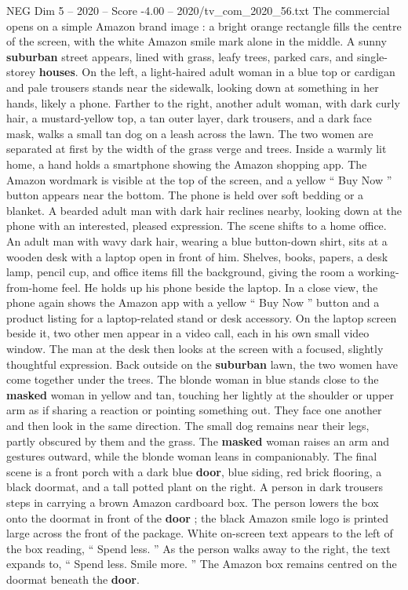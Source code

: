 \begin{textsample}{NEG Dim 5 – 2020 – Score -4.00 – 2020/tv\_com\_2020\_56.txt}  \label{ex:f5_neg_034}
The commercial opens on a simple Amazon brand image : a bright orange rectangle fills the centre of the screen, with the white Amazon smile mark alone in the middle.
A sunny \textbf{suburban} street appears, lined with grass, leafy trees, parked cars, and single-storey \textbf{houses}.
On the left, a light-haired adult woman in a blue top or cardigan and pale trousers stands near the sidewalk, looking down at something in her hands, likely a phone.
Farther to the right, another adult woman, with dark curly hair, a mustard-yellow top, a tan outer layer, dark trousers, and a dark face mask, walks a small tan dog on a leash across the lawn.
The two women are separated at first by the width of the grass verge and trees.
Inside a warmly lit home, a hand holds a smartphone showing the Amazon shopping app.
The Amazon wordmark is visible at the top of the screen, and a yellow “ Buy Now ” button appears near the bottom.
The phone is held over soft bedding or a blanket.
A bearded adult man with dark hair reclines nearby, looking down at the phone with an interested, pleased expression.
The scene shifts to a home office.
An adult man with wavy dark hair, wearing a blue button-down shirt, sits at a wooden desk with a laptop open in front of him.
Shelves, books, papers, a desk lamp, pencil cup, and office items fill the background, giving the room a working-from-home feel.
He holds up his phone beside the laptop.
In a close view, the phone again shows the Amazon app with a yellow “ Buy Now ” button and a product listing for a laptop-related stand or desk accessory.
On the laptop screen beside it, two other men appear in a video call, each in his own small video window.
The man at the desk then looks at the screen with a focused, slightly thoughtful expression.
Back outside on the \textbf{suburban} lawn, the two women have come together under the trees.
The blonde woman in blue stands close to the \textbf{masked} woman in yellow and tan, touching her lightly at the shoulder or upper arm as if sharing a reaction or pointing something out.
They face one another and then look in the same direction.
The small dog remains near their legs, partly obscured by them and the grass.
The \textbf{masked} woman raises an arm and gestures outward, while the blonde woman leans in companionably.
The final scene is a front porch with a dark blue \textbf{door}, blue siding, red brick flooring, a black doormat, and a tall potted plant on the right.
A person in dark trousers steps in carrying a brown Amazon cardboard box.
The person lowers the box onto the doormat in front of the \textbf{door} ; the black Amazon smile logo is printed large across the front of the package.
White on-screen text appears to the left of the box reading, “ Spend less. ” As the person walks away to the right, the text expands to, “ Spend less.
Smile more. ” The Amazon box remains centred on the doormat beneath the \textbf{door}.

\end{textsample}
